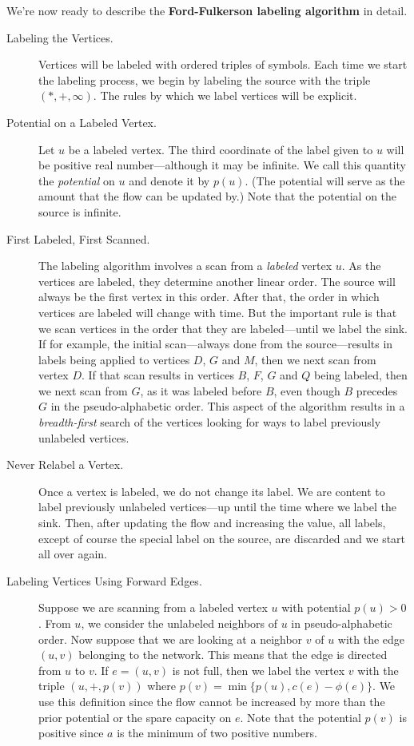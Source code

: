 We're now ready to describe the \textbf{Ford-Fulkerson labeling
  algorithm} in detail.
\begin{description}
\item[Labeling the Vertices.] Vertices will be labeled with ordered
  triples of symbols.  Each time we start the labeling process, we
  begin by labeling the source with the triple $(*,+,\infty)$.  The
  rules by which we label vertices will be explicit.

\item[Potential on a Labeled Vertex.]  Let $u$ be a labeled vertex.
  The third coordinate of the label given to $u$ will be positive real
  number---although it may be infinite.  We call this quantity the
  \textit{potential} on $u$ and denote it by $p(u)$. (The potential
  will serve as the amount that the flow can be updated by.) Note that
  the potential on the source is infinite.

\item[First Labeled, First Scanned.]  The labeling algorithm involves
  a scan from a \emph{labeled} vertex $u$.  As the vertices are
  labeled, they determine another linear order.  The source will
  always be the first vertex in this order.  After that, the order in
  which vertices are labeled will change with time.  But the important
  rule is that we scan vertices in the order that they are
  labeled---until we label the sink.  If for example, the initial
  scan---always done from the source---results in labels being applied
  to vertices $D$, $G$ and $M$, then we next scan from vertex $D$.  If
  that scan results in vertices $B$, $F$, $G$ and $Q$ being labeled,
  then we next scan from $G$, as it was labeled before $B$, even
  though $B$ precedes $G$ in the pseudo-alphabetic order.  This aspect
  of the algorithm results in a \textit{breadth-first} search of the
  vertices looking for ways to label previously unlabeled vertices.

\item[Never Relabel a Vertex.]  Once a vertex is labeled, we do not
  change its label.  We are content to label previously unlabeled
  vertices---up until the time where we label the sink.  Then, after
  updating the flow and increasing the value, all labels, except of
  course the special label on the source, are discarded and we start
  all over again.

\item[Labeling Vertices Using Forward Edges.]  Suppose we are scanning
  from a labeled vertex $u$ with potential $p(u)>0$.  From $u$, we
  consider the unlabeled neighbors of $u$ in pseudo-alphabetic order.
  Now suppose that we are looking at a neighbor $v$ of $u$ with the
  edge $(u,v)$ belonging to the network.  This means that the edge is
  directed from $u$ to $v$.  If $e=(u,v)$ is not full, then we label
  the vertex $v$ with the triple $(u,+,p(v))$ where
  $p(v)=\min\{p(u),c(e)-\phi(e)\}$. We use this definition since the
  flow cannot be increased by more than the prior potential or the
  spare capacity on $e$. Note that the potential $p(v)$ is positive
  since $a$ is the minimum of two positive numbers.


\end{description}
